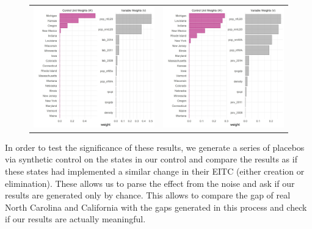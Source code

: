 \documentclass{article}
\begin{document}
\begin{figure}
\begin{center}
\begin{tabular}{cc}
 \includegraphics[width=80mm]{nc_lab_weights} &   \includegraphics[width=80mm]{nc_pov_weights} \\
\end{tabular}
\end{center}
\label{fig:weights}{}
\end{figure}

\restoregeometry

In order to test the significance of these results, we generate a series of placebos via synthetic control on the states in our control and compare the results as if these states had implemented a similar change in their EITC (either creation or elimination). These allows us to parse the effect from the noise and ask if our results are generated only by chance. This allows to compare the gap of real North Carolina and California with the gaps generated in this process and check if our results are actually meaningful.
\end{document}
